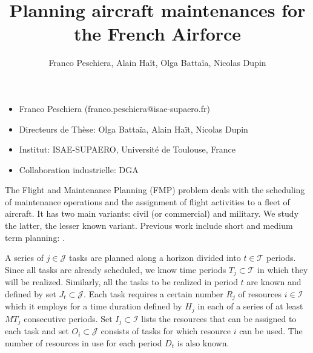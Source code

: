 \documentclass{roadef}
\begin{document}
\title{Planning aircraft maintenances for the French Airforce}


\author{Franco Peschiera, Alain Haït, Olga Battaïa, Nicolas Dupin}




\maketitle


\begin{itemize}
	\item[] Franco Peschiera (franco.peschiera@isae-supaero.fr)
	\item[] Directeurs de Thèse: Olga Battaïa, Alain Haït, Nicolas Dupin
	\item[] Institut: ISAE-SUPAERO, Université de Toulouse, France
	\item[] Collaboration industrielle: DGA
\end{itemize}






% 
\abstract{}

The Flight and Maintenance Planning (FMP) problem deals with the scheduling of maintenance operations and the assignment of flight activities to a fleet of aircraft. It has two main variants: civil (or commercial) and military. We study the latter, the lesser known variant. Previous work include short and medium term planning: \cite{Cho2011,Kozanidis2008,Verhoeff2015,marlow2017optimal,Seif2018}.

A series of $j \in \mathcal{J}$ tasks are planned along a horizon divided into $t \in \mathcal{T}$ periods. Since all tasks are already scheduled, we know time periods $T_j \subset \mathcal{T}$ in which they will be realized. Similarly, all the tasks to be realized in period $t$ are known and defined by set $J_t \subset \mathcal{J}$. Each task requires a certain number $R_{j}$ of resources $i \in \mathcal{I}$ which it employs for a time duration defined by $H_j$ in each of a series of at least $MT_j$ consecutive periods. Set $I_{j} \subset \mathcal{I}$ lists the resources that can be assigned to each task and set $O_i \subset \mathcal{J}$ consists of tasks for which resource $i$ can be used. The number of resources in use for each period $D_t$ is also known.
\end{document}
